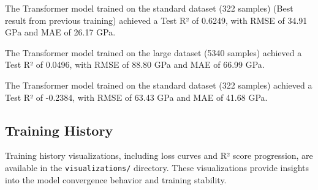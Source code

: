 \documentclass[11pt,a4paper]{article}
\begin{document}
The Transformer model trained on the standard dataset (322 samples) (Best result from previous training) achieved a Test R² of 0.6249, with RMSE of 34.91 GPa and MAE of 26.17 GPa.

The Transformer model trained on the large dataset (5340 samples) achieved a Test R² of 0.0496, with RMSE of 88.80 GPa and MAE of 66.99 GPa.

The Transformer model trained on the standard dataset (322 samples) achieved a Test R² of -0.2384, with RMSE of 63.43 GPa and MAE of 41.68 GPa.

\subsection{Training History}

Training history visualizations, including loss curves and R² score progression, are available in the \texttt{visualizations/} directory. These visualizations provide insights into the model convergence behavior and training stability.
\end{document}
